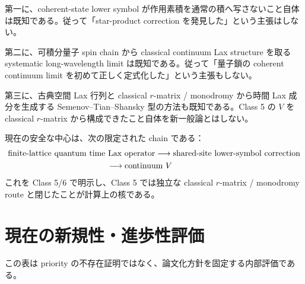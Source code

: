 第一に、coherent-state lower symbol が作用素積を通常の積へ写さないこと自体は既知である\cite{SuzukiTsuchiya2017,Schlichenmaier2010}。従って「star-product correction を発見した」という主張はしない。

第二に、可積分量子 spin chain から classical continuum Lax structure を取る systematic long-wavelength limit は既知である\cite{ADS2010}。従って「量子鎖の coherent continuum limit を初めて正しく定式化した」という主張もしない。

第三に、古典空間 Lax 行列と classical $r$-matrix / monodromy から時間 Lax 成分を生成する Semenov--Tian--Shansky 型の方法も既知である\cite{DoikouKaraiskos2011}。Class 5 の $V$ を classical $r$-matrix から構成できたこと自体を新一般論とはしない。

現在の安全な中心は、次の限定された chain である：
\begin{equation}
\begin{aligned}
&\text{finite-lattice quantum time Lax operator}
\longrightarrow \text{shared-site lower-symbol correction}\\
&\hspace{42mm}\longrightarrow \text{continuum }V
\end{aligned}
\label{eq:safeClaim}
\end{equation}
これを Class 5/6 で明示し、Class 5 では独立な classical $r$-matrix / monodromy route と閉じたことが計算上の核である。

\section{現在の新規性・進歩性評価}
この表は priority の不存在証明ではなく、論文化方針を固定する内部評価である。

